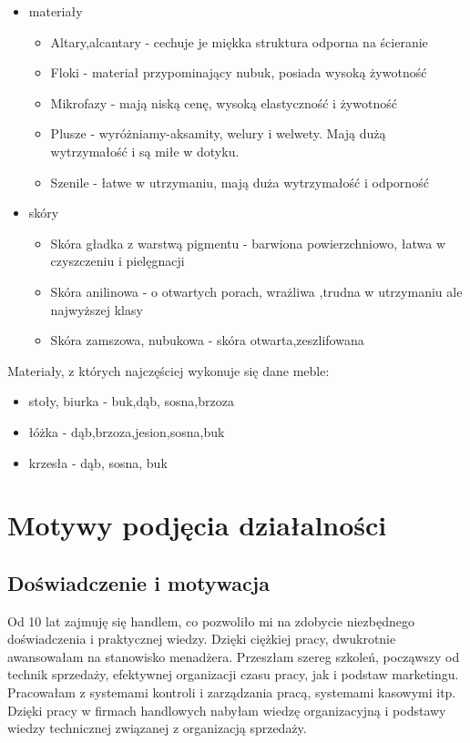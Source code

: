 		\begin{itemize}	
			\item{materiały}
				\begin{itemize}
					\item{Altary,alcantary} - cechuje je miękka struktura odporna na ścieranie
					\item{Floki} - materiał przypominający nubuk, posiada wysoką żywotność
					\item{Mikrofazy} - mają niską cenę, wysoką elastyczność i żywotność
					\item{Plusze} - wyróżniamy-aksamity, welury i welwety. Mają dużą wytrzymałość i są miłe w dotyku.
					\item{Szenile} - łatwe w utrzymaniu, mają duża wytrzymałość i odporność
				\end{itemize}
			\item{skóry}
				\begin{itemize}
					\item{Skóra gładka z warstwą pigmentu} - barwiona powierzchniowo, łatwa w czyszczeniu i pielęgnacji
					\item{Skóra anilinowa} - o otwartych porach, wrażliwa ,trudna w utrzymaniu ale najwyższej klasy
					\item{Skóra zamszowa, nubukowa} - skóra otwarta,zeszlifowana
				\end{itemize}
		\end{itemize}
			
		\par Materiały, z których najczęściej wykonuje się dane meble:
		\begin{itemize}
			\item{stoły, biurka} - buk,dąb, sosna,brzoza
			\item{łóżka} - dąb,brzoza,jesion,sosna,buk
			\item{krzesła} - dąb, sosna, buk
		\end{itemize}
		
	\section{Motywy podjęcia działalności}
		\subsection{Doświadczenie i motywacja}
			\par Od 10 lat zajmuję się handlem, co pozwoliło mi na zdobycie niezbędnego doświadczenia i praktycznej wiedzy. Dzięki ciężkiej pracy, dwukrotnie awansowałam na stanowisko menadżera. Przeszłam szereg szkoleń, począwszy od technik sprzedaży, efektywnej organizacji czasu pracy, jak i podstaw marketingu. Pracowałam z systemami kontroli i zarządzania pracą, systemami kasowymi itp. Dzięki pracy w firmach handlowych nabyłam wiedzę organizacyjną i podstawy wiedzy technicznej związanej z organizacją sprzedaży. 

